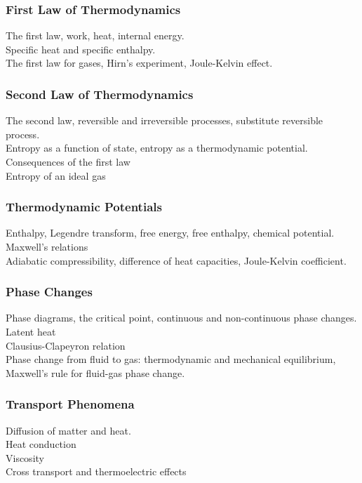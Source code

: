 \documentclass[11pt, a4paper]{article}
\begin{document}
\subsubsection{First Law of Thermodynamics}
The first law, work, heat, internal energy. \\
Specific heat and specific enthalpy.\\
The first law for gases, Hirn's experiment, Joule-Kelvin effect.

\subsubsection{Second Law of Thermodynamics}
The second law, reversible and irreversible processes, substitute reversible process.\\ Entropy as a function of state, entropy as a thermodynamic potential. \\
Consequences of the first law\\
Entropy of an ideal gas

\subsubsection{Thermodynamic Potentials}
Enthalpy, Legendre transform, free energy, free enthalpy, chemical potential.\\
Maxwell's relations\\
Adiabatic compressibility, difference of heat capacities, Joule-Kelvin coefficient.

\subsubsection{Phase Changes}
Phase diagrams, the critical point, continuous and non-continuous phase changes.\\
Latent heat\\
Clausius-Clapeyron relation\\
Phase change from fluid to gas: thermodynamic and mechanical equilibrium, Maxwell's rule for fluid-gas phase change.

\subsubsection{Transport Phenomena}
Diffusion of matter and heat.\\
Heat conduction\\
Viscosity\\
Cross transport and thermoelectric effects
\end{document}
